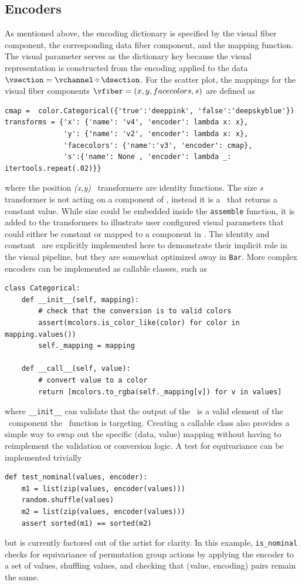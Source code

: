 \documentclass[../main.tex]{subfiles}
\begin{document}
\subsection{Encoders \vchannel}
\label{sec:code_channels}
As mentioned above, the encoding dictionary is specified by the visual fiber component, the corresponding data fiber component, and the mapping function. The visual parameter serves as the dictionary key because the visual representation is constructed from the encoding applied to the data  $\vsection = \vchannel \circ \dsection$. For the scatter plot, the mappings for the visual fiber components $\vfiber=(x,y, facecolors, s)$ are defined as
\begin{verbatim}
cmap =  color.Categorical({'true':'deeppink', 'false':'deepskyblue'})
transforms = {'x': {'name': 'v4', 'encoder': lambda x: x},
              'y': {'name': 'v2', 'encoder': lambda x: x},
              'facecolors': {'name':'v3', 'encoder': cmap}, 
              's':{'name': None , 'encoder': lambda _: itertools.repeat(.02)}}
\end{verbatim}
where the position \textit{(x,y)} \vchannel\ transformers are identity functions. The size \textit{s} transformer is not acting on a component of \dfiber, instead it is a \vchannel\ that returns a constant value. While size could be embedded inside the \texttt{assemble} function, it is added to the transformers to illustrate user configured visual parameters that could either be constant or mapped to a component in \dfiber. The identity and constant \vchannel\ are explicitly implemented here to demonstrate their implicit role in the visual pipeline, but they are somewhat optimized away in \texttt{Bar}. More complex encoders can be implemented as callable classes, such as 
\begin{verbatim}
class Categorical:
    def __init__(self, mapping):
        # check that the conversion is to valid colors
        assert(mcolors.is_color_like(color) for color in mapping.values())
        self._mapping = mapping

    def __call__(self, value):
        # convert value to a color
        return [mcolors.to_rgba(self._mapping[v]) for v in values]
\end{verbatim}

where \texttt{__init__} can validate that the output of the \vchannel\ is a valid element of the \vfiber\ component the \vchannel\ function is targeting. Creating a callable class also provides a simple way to swap out the specific (data, value) mapping without having to reimplement the validation or conversion logic. A test for equivariance can be implemented trivially
\begin{verbatim}
def test_nominal(values, encoder):
    m1 = list(zip(values, encoder(values)))
    random.shuffle(values)
    m2 = list(zip(values, encoder(values)))
    assert sorted(m1) == sorted(m2)
\end{verbatim}
but is currently factored out of the artist for clarity. In this example, \texttt{is_nominal} checks for equivariance of permutation group actions by applying the encoder to a set of values, shuffling values, and checking that (value, encoding) pairs remain the same.
\end{document}
